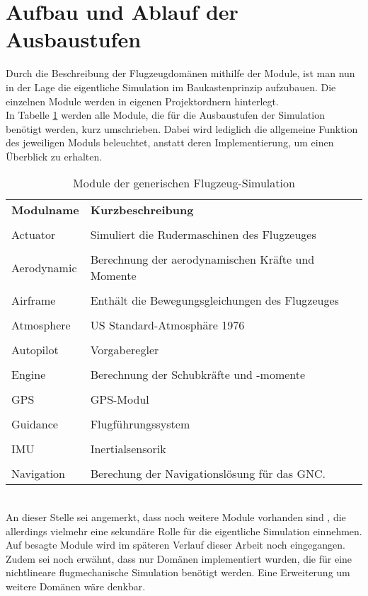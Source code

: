 \section{Aufbau und Ablauf der Ausbaustufen}
\label{sec:Ausbaustufen}
Durch die Beschreibung der Flugzeugdomänen mithilfe der Module, ist man nun in der Lage die eigentliche Simulation im Baukastenprinzip aufzubauen. Die einzelnen Module werden in eigenen Projektordnern hinterlegt.\\ In Tabelle \ref{tab:Modulbeschreibungen} werden alle Module, die für die Ausbaustufen der Simulation benötigt werden, kurz umschrieben. Dabei wird lediglich die allgemeine Funktion des jeweiligen Moduls beleuchtet, anstatt deren Implementierung, um einen Überblick zu erhalten. 
\begin{table}[h]
	\centering	\begin{tabular}{l p{9cm}}
		\textbf{Modulname} & \textbf{Kurzbeschreibung}\\\\
		Actuator	& Simuliert die Rudermaschinen des Flugzeuges\\\\
		Aerodynamic & Berechnung der aerodynamischen Kräfte und Momente\\\\
		Airframe & Enthält die Bewegungsgleichungen des Flugzeuges\\\\
		Atmosphere & US Standard-Atmosphäre 1976\\\\
		Autopilot & Vorgaberegler\\\\
		Engine & Berechnung der Schubkräfte und -momente\\\\
		GPS & GPS-Modul \\\\
		Guidance & Flugführungssystem\\\\
		IMU & Inertialsensorik\\\\
		Navigation &  Berechung der Navigationslösung für das GNC.
	\end{tabular}
	\caption{Module der generischen Flugzeug-Simulation}
	\label{tab:Modulbeschreibungen}
\end{table}\\
An dieser Stelle sei angemerkt, dass noch weitere Module vorhanden sind , die allerdings vielmehr eine sekundäre Rolle für die eigentliche Simulation einnehmen. Auf besagte Module wird im späteren Verlauf dieser Arbeit noch eingegangen. Zudem sei noch erwähnt, dass nur Domänen implementiert wurden, die für eine nichtlineare flugmechanische Simulation benötigt werden. Eine Erweiterung um weitere Domänen wäre denkbar. \\
